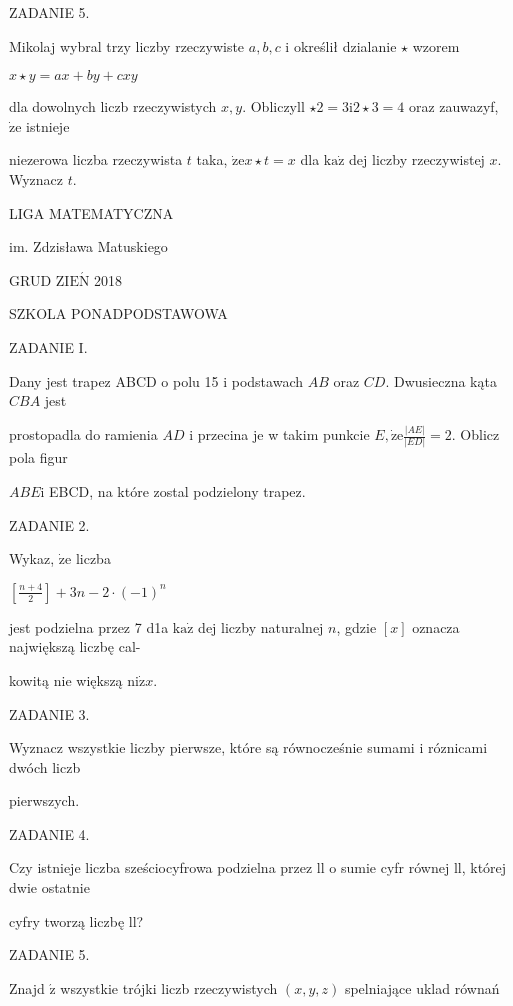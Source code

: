 \documentclass[a4paper,12pt]{article}
\begin{document}
ZADANIE 5.

Mikolaj wybral trzy liczby rzeczywiste $a, b, c$ i określił dzialanie $\star$ wzorem

$x\star y=ax+by+cxy$

dla dowolnych liczb rzeczywistych $x, y$. Obliczyll $\star 2=3\mathrm{i}2\star 3=4$ oraz zauwazyf, $\dot{\mathrm{z}}\mathrm{e}$ istnieje

niezerowa liczba rzeczywista $t$ taka, $\dot{\mathrm{z}}\mathrm{e}x\star t=x$ dla $\mathrm{k}\mathrm{a}\dot{\mathrm{z}}$ dej liczby rzeczywistej $x$. Wyznacz $t.$






LIGA MATEMATYCZNA

im. Zdzisława Matuskiego

GRUD Z$\mathrm{I}\mathrm{E}\acute{\mathrm{N}}$ 2018

SZKOLA PONADPODSTAWOWA

ZADANIE I.

Dany jest trapez ABCD o polu 15 i podstawach $AB$ oraz $CD$. Dwusieczna kąta $CBA$ jest

prostopadla do ramienia $AD$ i przecina je w takim punkcie $E, \dot{\mathrm{z}}\mathrm{e} \displaystyle \frac{|AE|}{|ED|}=2$. Oblicz pola figur

$ABE\mathrm{i}$ EBCD, na które zostal podzielony trapez.

ZADANIE 2.

Wykaz, $\dot{\mathrm{z}}\mathrm{e}$ liczba

$[\displaystyle \frac{n+4}{2}]+3n-2\cdot(-1)^{n}$

jest podzielna przez 7 d1a $\mathrm{k}\mathrm{a}\dot{\mathrm{z}}$ dej liczby naturalnej $n$, gdzie $[x]$ oznacza największą liczbę cal-

kowitą nie większą $\mathrm{n}\mathrm{i}\dot{\mathrm{z}}x.$

ZADANIE 3.

Wyznacz wszystkie liczby pierwsze, które są równocześnie sumami i róznicami dwóch liczb

pierwszych.

ZADANIE 4.

Czy istnieje liczba sześciocyfrowa podzielna przez ll o sumie cyfr równej ll, której dwie ostatnie

cyfry tworzą liczbę ll?

ZADANIE 5.

Znajd $\acute{\mathrm{z}}$ wszystkie trójki liczb rzeczywistych $(x,y,z)$ spelniające uklad równań
\end{document}
